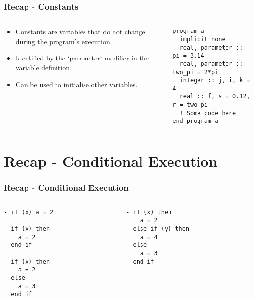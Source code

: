 \begin{frame}[fragile]
  \frametitle{Recap - Constants}
  \begin{columns}[T]
    \begin{column}{0.45\textwidth}
      \begin{itemize}
        \item Constants are variables that do not change during the program's execution.
        \item Identified by the `parameter` modifier in the variable definition.
        \item Can be used to initialise other variables.
      \end{itemize}
    \end{column}

    \begin{column}{0.55\textwidth}
      \begin{lstlisting}
program a
  implicit none
  real, parameter :: pi = 3.14
  real, parameter :: two_pi = 2*pi
  integer :: j, i, k = 4
  real :: f, s = 0.12, r = two_pi
  ! Some code here
end program a
      \end{lstlisting}
    \end{column}
  \end{columns}
\end{frame}

\section{Recap - Conditional Execution}

\begin{frame}[fragile]
  \frametitle{Recap - Conditional Execution}
  \begin{columns}[T]
    \begin{column}{0.5\textwidth}
      \begin{lstlisting}
- if (x) a = 2

- if (x) then
    a = 2
  end if

- if (x) then
    a = 2
  else
    a = 3
  end if
      \end{lstlisting}
    \end{column}

    \begin{column}{0.5\textwidth}
      \begin{lstlisting}
- if (x) then
    a = 2
  else if (y) then
    a = 4
  else
    a = 3
  end if
      \end{lstlisting}
    \end{column}
  \end{columns}
\end{frame}

